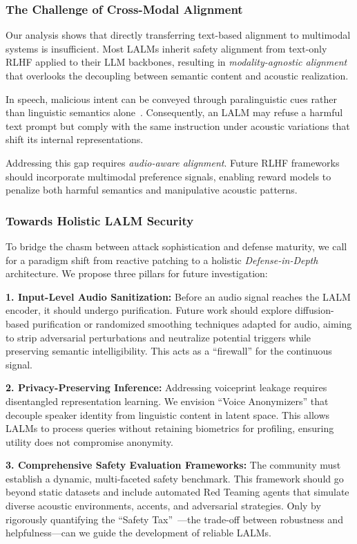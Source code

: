 \documentclass{llmxive}
\begin{document}
\subsubsection{The Challenge of Cross-Modal Alignment}

Our analysis shows that directly transferring text-based alignment to multimodal systems is insufficient. Most LALMs inherit safety alignment from text-only RLHF applied to their LLM backbones, resulting in \textit{modality-agnostic alignment} that overlooks the decoupling between semantic content and acoustic realization.

In speech, malicious intent can be conveyed through paralinguistic cues rather than linguistic semantics alone~\cite{lin2025hidden}. Consequently, an LALM may refuse a harmful text prompt but comply with the same instruction under acoustic variations that shift its internal representations.

Addressing this gap requires \textit{audio-aware alignment}. Future RLHF frameworks should incorporate multimodal preference signals, enabling reward models to penalize both harmful semantics and manipulative acoustic patterns.

\subsubsection{Towards Holistic LALM Security}

To bridge the chasm between attack sophistication and defense maturity, we call for a paradigm shift from reactive patching to a holistic \textit{Defense-in-Depth} architecture. We propose three pillars for future investigation:

\textbf{1. Input-Level Audio Sanitization:} Before an audio signal reaches the LALM encoder, it should undergo purification. Future work should explore diffusion-based purification or randomized smoothing techniques adapted for audio, aiming to strip adversarial perturbations and neutralize potential triggers while preserving semantic intelligibility. This acts as a ``firewall'' for the continuous signal.

\textbf{2. Privacy-Preserving Inference:} Addressing voiceprint leakage requires disentangled representation learning. We envision ``Voice Anonymizers'' that decouple speaker identity from linguistic content in latent space. This allows LALMs to process queries without retaining biometrics for profiling, ensuring utility does not compromise anonymity.

\textbf{3. Comprehensive Safety Evaluation Frameworks:} The community must establish a dynamic, multi-faceted safety benchmark. This framework should go beyond static datasets and include automated Red Teaming agents that simulate diverse acoustic environments, accents, and adversarial strategies. Only by rigorously quantifying the ``Safety Tax''~\cite{huang2025safety}—the trade-off between robustness and helpfulness—can we guide the development of reliable LALMs.
\end{document}
